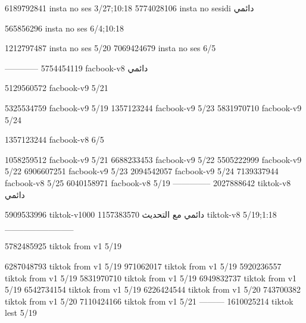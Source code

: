 
6189792841 insta no ses
3/27;10:18
5774028106 insta no sesidi
دائمي


565856296 insta no ses
6/4;10:18


1212797487 insta no ses
5/20
7069424679 insta no ses
6/5

------------
5754454119 facbook-v8
دائمي

5129560572 facbook-v9
5/21

5325534759 facbook-v9
5/19
1357123244 facbook-v9
5/23
5831970710 facbook-v9
5/24

1357123244 facbook-v8
6/5

1058259512 facbook-v9
5/21
6688233453 facbook-v9
5/22
5505222999 facbook-v9
5/22
6906607251 facbook-v9
5/23
2094542057 facbook-v9
5/24
7139337944 facbook-v8
5/25
6040158971 facbook-v8
5/19
--------------
2027888642 tiktok-v8
دائمي

5909533996 tiktok-v1000
دائمي مع التحديث
1157383570 tiktok-v8
5/19;1:18
___________

5782485925 tiktok from v1
5/19

6287048793 tiktok from v1
5/19
971062017 tiktok from v1
5/19
5920236557 tiktok from v1
5/19
5831970710 tiktok from v1
5/19
6949832737 tiktok from v1
5/19
6542734154 tiktok from v1
5/19
6226424544 tiktok from v1
5/20
743700382 tiktok from v1
5/20
7110424166 tiktok from v1
5/21
---------
1610025214 tiktok lest
5/19
